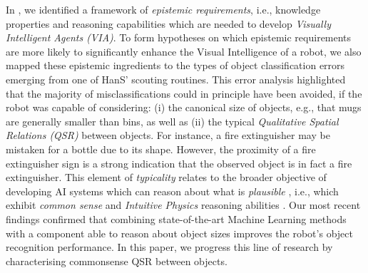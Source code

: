 \documentclass{article}
\begin{document}
In \cite{chiatti_towards_2020}, we identified a framework of \textit{epistemic requirements}, i.e., knowledge properties and reasoning capabilities which are needed to develop \textit{Visually Intelligent Agents (VIA)}. To form hypotheses on which epistemic requirements are more likely to significantly enhance the Visual Intelligence of a robot, we also mapped these epistemic ingredients to the types of object classification errors emerging from one of HanS' scouting routines. This error analysis highlighted that the majority of misclassifications could in principle have been avoided, if the robot was capable of considering: (i) the canonical size of objects, e.g., that mugs are generally smaller than bins, as well as (ii) the typical \textit{Qualitative Spatial Relations (QSR)} between objects. For instance, a fire extinguisher may be mistaken for a bottle due to its shape. However, the proximity of a fire extinguisher sign is a strong indication that the observed object is in fact a fire extinguisher. This element of \textit{typicality} relates to the broader objective of developing AI systems which can reason about what is \textit{plausible} \cite{davis_commonsense_2015}, i.e., which exhibit \textit{common sense} \cite{levesque_common_nodate} and \textit{Intuitive Physics} reasoning abilities \cite{hayes_second_1988,lake_building_2017}. Our most recent findings \cite{chiatti2021aaaimake} confirmed that combining state-of-the-art Machine Learning methods with a component able to reason about object sizes improves the robot's object recognition performance. In this paper, we progress this line of research by characterising commonsense QSR between objects.          
\end{document}
